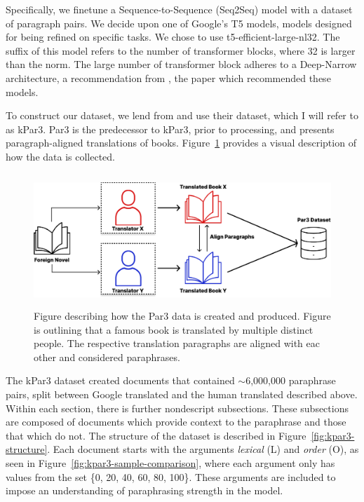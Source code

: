 \documentclass{l4proj}
\theoremstyle{definition}
\newcommand{\codefont}[1]{{\fontfamily{qcr}\selectfont #1}}
\begin{document}
        Specifically, we finetune a Sequence-to-Sequence (Seq2Seq) model with a dataset of paragraph pairs. We decide upon one of Google's T5 models, models designed for being refined on specific tasks. We chose to use \codefont{t5-efficient-large-nl32}. The suffix of this model refers to the number of transformer blocks, where 32 is larger than the norm. The large number of transformer block adheres to a Deep-Narrow architecture, a recommendation from \citet{tay2022scale}, the paper which recommended these models.

        To construct our dataset, we lend from \citet{krishna2023paraphrasing} and use their dataset, which I will refer to as kPar3. Par3 \citep{Par3_2022} is the predecessor to kPar3, prior to processing, and presents paragraph-aligned translations of books. Figure~\ref{fig:par3-collection-process} provides a visual description of how the data is collected.

        \begin{figure}[h]
            \centering
            \includegraphics[width=1\linewidth, height=5cm, keepaspectratio]{images/methods/par3-collection-explanation.pdf}
            \caption{Figure describing how the Par3 data is created and produced. Figure is outlining that a famous book is translated by multiple distinct people. The respective translation paragraphs are aligned with eac
         other and considered paraphrases.}
            \label{fig:par3-collection-process}
        \end{figure}

        The kPar3 dataset created documents that contained $\sim$6,000,000 paraphrase pairs, split between Google translated and the human translated described above. Within each section, there is further nondescript subsections. These subsections are composed of documents which provide context to the paraphrase and those that which do not. The structure of the dataset is described in Figure~\ref{fig:kpar3-structure}. Each document starts with the arguments \emph{lexical} (L) and \emph{order} (O), as seen in Figure~\ref{fig:kpar3-sample-comparison}, where each argument only has values from the set \{0, 20, 40, 60, 80, 100\}. These arguments are included to impose an understanding of paraphrasing strength in the model.
\end{document}
